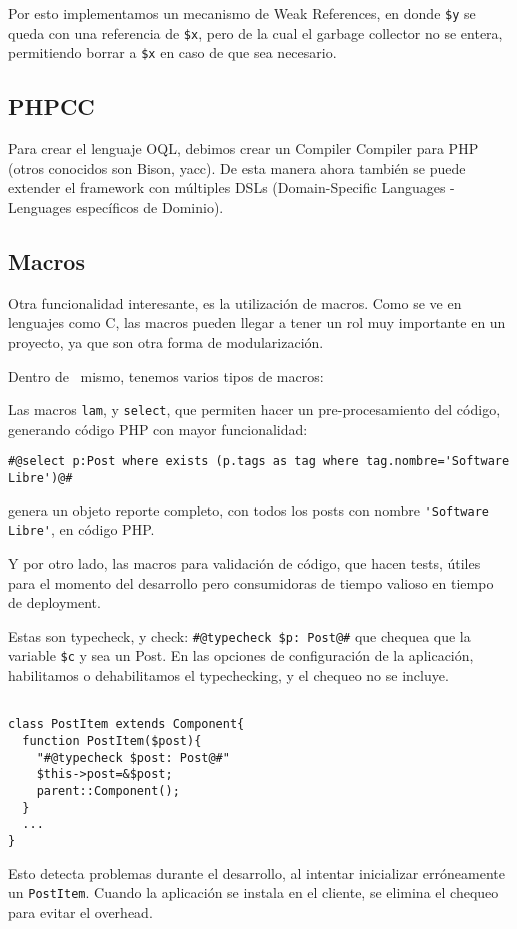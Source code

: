 Por esto implementamos un mecanismo de Weak References, en donde \verb"$y" se queda con una referencia de \verb"$x", pero de la cual el garbage collector no se entera, permitiendo borrar a \verb"$x" en caso de que sea necesario.

\subsection{PHPCC}
\label{sub-phpcc}
Para crear el lenguaje OQL, debimos crear un Compiler Compiler para PHP (otros conocidos son Bison, yacc).
De esta manera ahora también se puede extender el framework con múltiples DSLs (Domain-Specific Languages - Lenguages específicos de Dominio).

\subsection{Macros}
\label{sub-macros}
Otra funcionalidad interesante, es la utilización de macros. Como se ve en lenguajes como C, las macros pueden llegar a tener un rol muy importante en un proyecto, ya que son otra forma de modularización.

Dentro de \PWB \ mismo, tenemos varios tipos de macros:

Las macros \verb"lam", y \verb"select", que permiten hacer un pre-procesamiento del código, generando código PHP con mayor funcionalidad:

\verb"#@select p:Post where exists (p.tags as tag where tag.nombre='Software Libre')@#"%

genera un objeto reporte completo, con todos los posts con nombre \verb"'Software Libre'", en código PHP.

Y por otro lado, las macros para validación de código, que hacen tests, útiles para el momento del desarrollo pero consumidoras de tiempo valioso en tiempo de deployment.

Estas son typecheck, y check:
\verb"#@typecheck $p: Post@#" %
que chequea que la variable \verb"$c" y %
 sea un Post. En las opciones de configuración de la aplicación, habilitamos o dehabilitamos el typechecking, y el chequeo no se incluye.
\begin{verbatim}

class PostItem extends Component{
  function PostItem($post){
	"#@typecheck $post: Post@#"
    $this->post=&$post;
    parent::Component();
  }
  ...
}
\end{verbatim}

Esto detecta problemas durante el desarrollo, al intentar inicializar erróneamente un \verb"PostItem". Cuando la aplicación se instala en el cliente, se elimina el chequeo para evitar el overhead.

